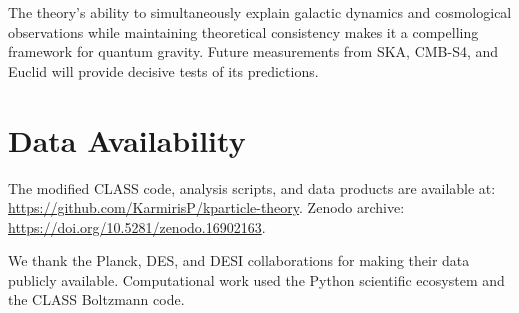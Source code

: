 \documentclass[aps,prd,twocolumn,showpacs,superscriptaddress,groupedaddress,nofootinbib]{revtex4-2}
\begin{document}
The theory's ability to simultaneously explain galactic dynamics and cosmological observations while maintaining theoretical consistency makes it a compelling framework for quantum gravity. Future measurements from SKA, CMB-S4, and Euclid will provide decisive tests of its predictions.

\section*{Data Availability}

The modified CLASS code, analysis scripts, and data products are available at: \url{https://github.com/KarmirisP/kparticle-theory}. Zenodo archive: \url{https://doi.org/10.5281/zenodo.16902163}.

\begin{acknowledgments}
We thank the Planck, DES, and DESI collaborations for making their data publicly available. Computational work used the Python scientific ecosystem and the CLASS Boltzmann code.
\end{acknowledgments}



\end{document}

